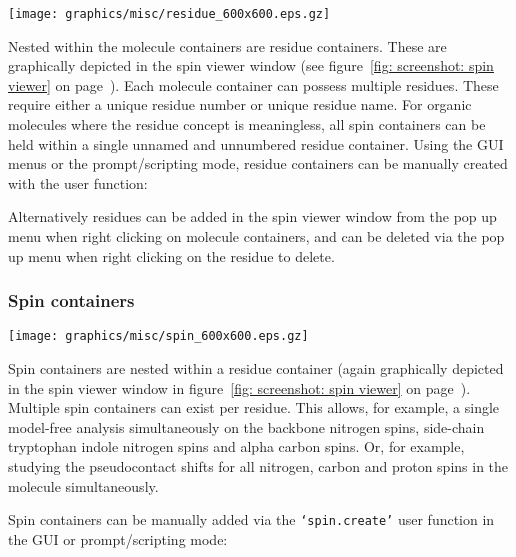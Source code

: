 \begin{figure*}[h]
\texttt{[image: graphics/misc/residue\_600x600.eps.gz]}
\end{figure*}

Nested within the molecule containers are residue containers.  These are graphically depicted in the spin viewer window (see figure~\ref{fig: screenshot: spin viewer} on page~\pageref{fig: screenshot: spin viewer}).  Each molecule container can possess multiple residues.  These require either a unique residue number or unique residue name.  For organic molecules where the residue concept is meaningless, all spin containers can be held within a single unnamed and unnumbered residue container.  Using the GUI menus or the prompt/scripting mode, residue containers can be manually created with the user function:


Alternatively residues can be added in the spin viewer window from the pop up menu when right clicking on molecule containers, and can be deleted via the pop up menu when right clicking on the residue to delete.



\newpage
\subsubsection{Spin containers}

\begin{figure*}[h]
\texttt{[image: graphics/misc/spin\_600x600.eps.gz]}
\end{figure*}

Spin containers are nested within a residue container (again graphically depicted in the spin viewer window in figure~\ref{fig: screenshot: spin viewer} on page~\pageref{fig: screenshot: spin viewer}).  Multiple spin containers can exist per residue.  This allows, for example, a single model-free analysis simultaneously on the backbone nitrogen spins, side-chain tryptophan indole nitrogen spins and alpha carbon spins.  Or, for example, studying the pseudocontact shifts for all nitrogen, carbon and proton spins in the molecule simultaneously.

Spin containers can be manually added via the \texttt{`spin.create'} user function in the GUI or prompt/scripting mode:


